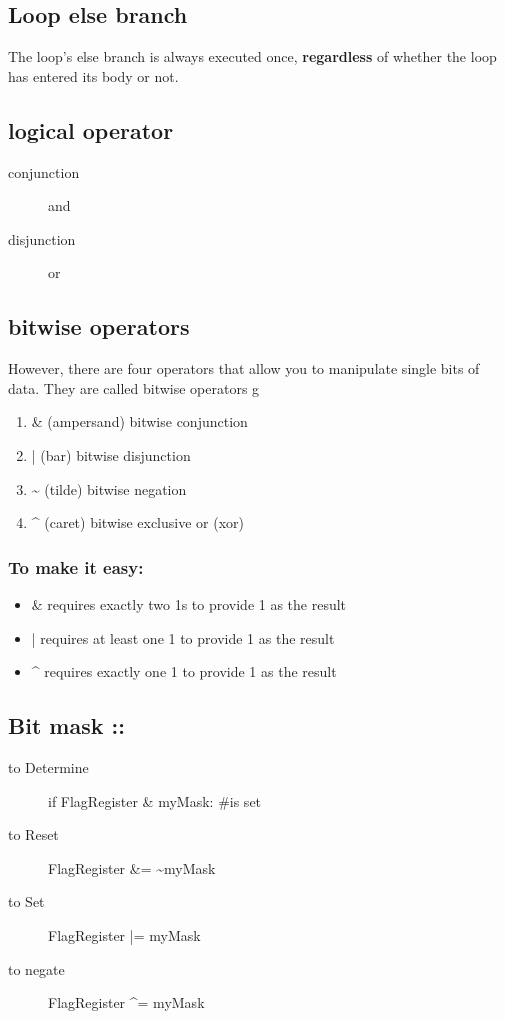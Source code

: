 \documentclass[11pt]{article}
\begin{document}
\subsection{Loop else branch}
\label{sec:org492ed68}
The loop’s else branch is always executed once, \textbf{regardless} of
whether the loop has entered its body or not.
\subsection{logical operator}
\label{sec:org4187aa8}
\begin{description}
\item[{conjunction}] and
\item[{disjunction}] or
\end{description}
\subsection{bitwise operators}
\label{sec:org8853cee}
However, there are four operators that allow you to manipulate single
bits of data. They are called bitwise operators
g
\begin{enumerate}
\item \&     (ampersand)  bitwise conjunction
\item |        (bar)              bitwise disjunction
\item \textasciitilde{}     (tilde)            bitwise negation
\item \^{}     (caret)           bitwise exclusive or (xor)
\end{enumerate}
\subsubsection{To make it easy:}
\label{sec:orgac5c6e1}
\begin{itemize}
\item \& requires exactly two 1s to provide 1 as the result
\item | requires at least one 1 to provide 1 as the result
\item \^{} requires exactly one 1 to provide 1 as the result
\end{itemize}
\subsection{Bit mask ::}
\label{sec:orgd3a3a98}
\begin{description}
\item[{to Determine}] if FlagRegister \& myMask: \#is set
\item[{to Reset}] FlagRegister \&= \textasciitilde{}myMask
\item[{to Set}] FlagRegister |= myMask
\item[{to negate}] FlagRegister \^{}= myMask
\end{description}
\end{document}
